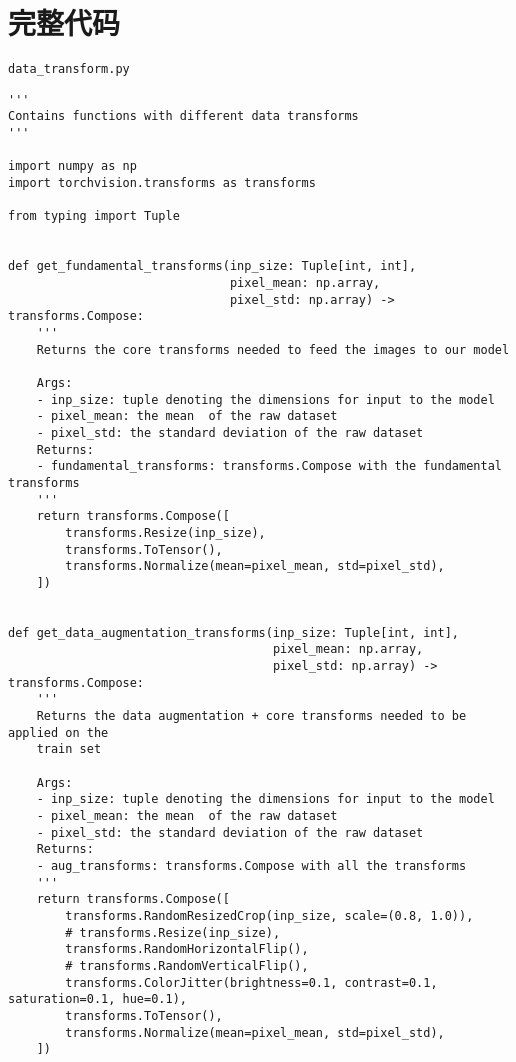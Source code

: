 \appendix

\section{完整代码}

\label{appendix:code}

\texttt{data\_transform.py}
\begin{lstlisting}[style=Python]
'''
Contains functions with different data transforms
'''

import numpy as np
import torchvision.transforms as transforms

from typing import Tuple


def get_fundamental_transforms(inp_size: Tuple[int, int],
                               pixel_mean: np.array,
                               pixel_std: np.array) -> transforms.Compose:
    '''
    Returns the core transforms needed to feed the images to our model

    Args:
    - inp_size: tuple denoting the dimensions for input to the model
    - pixel_mean: the mean  of the raw dataset
    - pixel_std: the standard deviation of the raw dataset
    Returns:
    - fundamental_transforms: transforms.Compose with the fundamental transforms
    '''
    return transforms.Compose([
        transforms.Resize(inp_size),
        transforms.ToTensor(),
        transforms.Normalize(mean=pixel_mean, std=pixel_std),
    ])


def get_data_augmentation_transforms(inp_size: Tuple[int, int],
                                     pixel_mean: np.array,
                                     pixel_std: np.array) -> transforms.Compose:
    '''
    Returns the data augmentation + core transforms needed to be applied on the
    train set

    Args:
    - inp_size: tuple denoting the dimensions for input to the model
    - pixel_mean: the mean  of the raw dataset
    - pixel_std: the standard deviation of the raw dataset
    Returns:
    - aug_transforms: transforms.Compose with all the transforms
    '''
    return transforms.Compose([
        transforms.RandomResizedCrop(inp_size, scale=(0.8, 1.0)),
        # transforms.Resize(inp_size),
        transforms.RandomHorizontalFlip(),
        # transforms.RandomVerticalFlip(),
        transforms.ColorJitter(brightness=0.1, contrast=0.1, saturation=0.1, hue=0.1),
        transforms.ToTensor(),
        transforms.Normalize(mean=pixel_mean, std=pixel_std),
    ])
\end{lstlisting}

